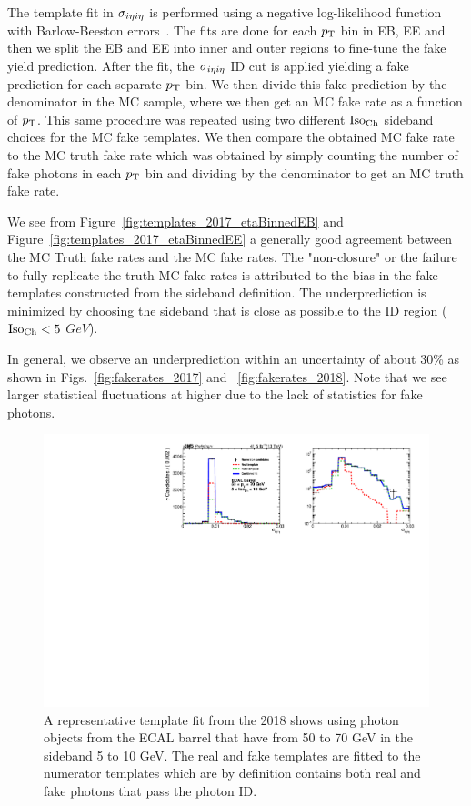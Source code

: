 
The template fit in $\sigma_{i\eta i\eta}$ is performed using a negative log-likelihood function with Barlow-Beeston errors~\cite{BarlowBeeston:1993}. The fits are done for each $p_{\mathrm{T}}$ bin in EB, EE and then we split the EB and EE into inner and outer regions to fine-tune the fake yield prediction. After the fit, the $\sigma_{i\eta i\eta}$ ID cut is applied yielding a fake prediction for each separate $p_{\mathrm{T}}$ bin. We then divide this fake prediction by the denominator in the MC sample, where we then get an MC fake rate as a function of $p_{\mathrm{T}}$. This same procedure was repeated using two different $\text{Iso}_{\text{Ch}}$ sideband choices for the MC fake templates. We then compare the obtained MC fake rate to the MC truth fake rate which was obtained by simply counting the number of fake photons in each $p_{\mathrm{T}}$ bin and dividing by the denominator to get an MC truth fake rate.

We see from Figure~\ref{fig:templates_2017_etaBinnedEB} and Figure~\ref{fig:templates_2017_etaBinnedEE} a generally good agreement between the MC Truth fake rates and the MC fake rates. The "non-closure" or the failure to fully replicate the truth MC fake rates is attributed to the bias in the fake templates constructed from the sideband definition. The underprediction is minimized by choosing the sideband that is close as possible to the ID region ($\text{Iso}_{\text{Ch}} < 5$ $GeV$).

In general, we observe an underprediction within an uncertainty of about 30\% as shown in Figs.~\ref{fig:fakerates_2017} and ~\ref{fig:fakerates_2018}. Note that we see larger statistical fluctuations at higher \pt due to the lack of statistics for fake photons.

\begin{figure}[!htbp]
\centering
\includegraphics[scale=0.85]{fig/fakeRatePlot_all_2017_EB_pT50To70_chIso5To10.pdf}
\caption{A representative template fit from the 2018 shows using photon objects from the ECAL barrel that have \pT from 50 to 70 GeV in the \chiso sideband 5 to 10 GeV. The real and fake templates are fitted to the numerator templates which are by definition contains both real and fake photons that pass the photon ID. }
\label{fig:templatefit_closure}
\end{figure}

